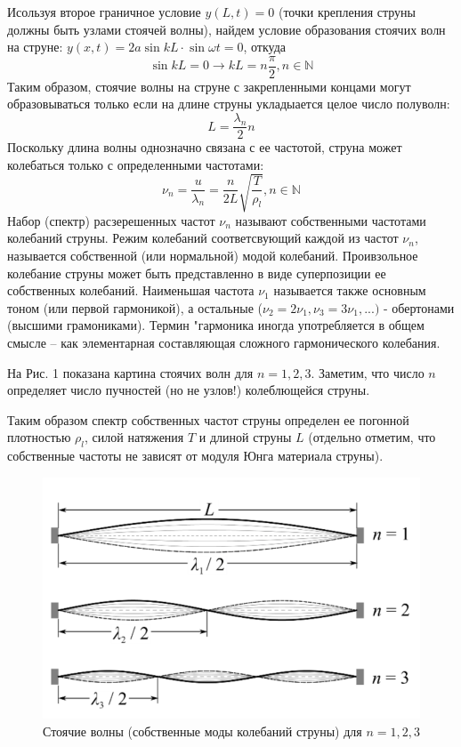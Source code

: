 \documentclass[a4paper,12pt]{article} %
\begin{document}
Исользуя второе граничное условие $y(L, t)=0$ (точки крепления струны должны быть узлами стоячей волны), найдем условие образования стоячих волн на струне: $y(x, t) = 2a\sin kL\cdot \sin \omega t = 0$, откуда
\[\sin kL = 0 \rightarrow kL = n\frac{\pi}{2},  n\in \mathbb{N}\] 
Таким образом, стоячие волны на струне с закрепленными концами могут образовываться только если на длине струны укладыается целое число полуволн:
\begin{equation}
L = \frac{\lambda_n}{2}n
\end{equation}
Поскольку длина волны однозначно связана с ее частотой, струна может колебаться только с определенными частотами:
\begin{equation}
\nu_n = \frac{u}{\lambda_n}=\frac{n}{2L}\sqrt{\frac{T}{\rho_l}}, n\in \mathbb{N}
\end{equation}
Набор (спектр) расзерешенных частот $\nu_n$ называют собственными частотами колебаний струны. Режим колебаний соответсвующий каждой из частот $\nu_n$, называется собственной (или нормальной) модой колебаний. Проивзольное колебание струны может быть представленно в виде суперпозиции ее собственных колебаний. Наименьшая частота $\nu_1$ называется также основным тоном (или первой гармоникой), а остальные ($\nu_2 = 2\nu_1, \nu_3 = 3\nu_1, ...)$ - обертонами (высшими грамониками). Термин "гармоника иногда употребляется в общем смысле -- как элементарная составляющая сложного гармонического колебания.

На Рис. 1 показана картина стоячих волн для $n = 1, 2, 3$. Заметим, что число $n$ определяет число пучностей (но не узлов!) колеблющейся струны.

Таким образом спектр собственных частот струны определен ее погонной плотностью $\rho_l$, силой натяжения $T$ и длиной струны $L$ (отдельно отметим, что собственные частоты не зависят от модуля Юнга материала струны).
\begin{figure}[h]
\centering
\includegraphics[scale=0.5]{2}
\caption{Стоячие волны (собственные моды колебаний струны) для $n =1, 2, 3$}
\end{figure}
\end{document}
